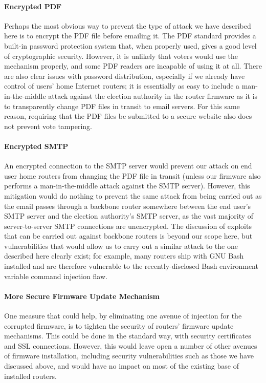 \documentclass{article}
\begin{document}
\paragraph{Encrypted PDF}

Perhaps the most obvious way to prevent the type of attack we have
described here is to encrypt the PDF file before emailing it. The PDF
standard provides a built-in password protection system that, when
properly used, gives a good level of cryptographic security. However,
it is unlikely that voters would use the mechanism properly, and some
PDF readers are incapable of using it at all. There are also clear
issues with password distribution, especially if we already have
control of users' home Internet routers; it is essentially as easy to
include a man-in-the-middle attack against the election authority in
the router firmware as it is to transparently change PDF files in
transit to email servers. For this same reason, requiring that the PDF
files be submitted to a secure website also does not prevent vote
tampering.

\paragraph{Encrypted SMTP}

An encrypted connection to the SMTP server would prevent our attack on
end user home routers from changing the PDF file in transit (unless
our firmware also performs a man-in-the-middle attack against the SMTP
server). However, this mitigation would do nothing to prevent the same
attack from being carried out as the email passes through a backbone
router somewhere between the end user's SMTP server and the election
authority's SMTP server, as the vast majority of server-to-server SMTP
connections are unencrypted. The discussion of exploits that can be
carried out against backbone routers is beyond our scope here, but
vulnerabilities that would allow us to carry out a similar attack to
the one described here clearly exist; for example, many routers ship
with GNU Bash installed and are therefore vulnerable to the
recently-disclosed Bash environment variable command injection flaw.

\paragraph{More Secure Firmware Update Mechanism}

One measure that could help, by eliminating one avenue of injection
for the corrupted firmware, is to tighten the security of routers'
firmware update mechanisms. This could be done in the standard way,
with security certificates and SSL connections. However, this would
leave open a number of other avenues of firmware installation,
including security vulnerabilities such as those we have discussed
above, and would have no impact on most of the existing base of
installed routers.
\end{document}
